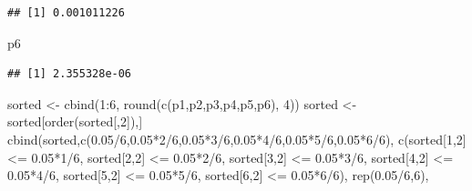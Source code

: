 \documentclass[
]{book}
\newenvironment{Shaded}{\begin{snugshade}}{\end{snugshade}}
\newcommand{\DecValTok}[1]{\textcolor[rgb]{0.00,0.00,0.81}{#1}}
\newcommand{\FloatTok}[1]{\textcolor[rgb]{0.00,0.00,0.81}{#1}}
\newcommand{\FunctionTok}[1]{\textcolor[rgb]{0.00,0.00,0.00}{#1}}
\newcommand{\NormalTok}[1]{#1}
\newcommand{\OtherTok}[1]{\textcolor[rgb]{0.56,0.35,0.01}{#1}}
\newcommand{\SpecialCharTok}[1]{\textcolor[rgb]{0.00,0.00,0.00}{#1}}
\begin{document}
\begin{verbatim}
## [1] 0.001011226
\end{verbatim}

\begin{Shaded}
\begin{Highlighting}[]
\NormalTok{p6}
\end{Highlighting}
\end{Shaded}

\begin{verbatim}
## [1] 2.355328e-06
\end{verbatim}

\begin{Shaded}
\begin{Highlighting}[]
\NormalTok{sorted }\OtherTok{\textless{}{-}} \FunctionTok{cbind}\NormalTok{(}\DecValTok{1}\SpecialCharTok{:}\DecValTok{6}\NormalTok{, }\FunctionTok{round}\NormalTok{(}\FunctionTok{c}\NormalTok{(p1,p2,p3,p4,p5,p6), }\DecValTok{4}\NormalTok{))}
\NormalTok{sorted }\OtherTok{\textless{}{-}}\NormalTok{ sorted[}\FunctionTok{order}\NormalTok{(sorted[,}\DecValTok{2}\NormalTok{]),]}
\FunctionTok{cbind}\NormalTok{(sorted,}\FunctionTok{c}\NormalTok{(}\FloatTok{0.05}\SpecialCharTok{/}\DecValTok{6}\NormalTok{,}\FloatTok{0.05}\SpecialCharTok{*}\DecValTok{2}\SpecialCharTok{/}\DecValTok{6}\NormalTok{,}\FloatTok{0.05}\SpecialCharTok{*}\DecValTok{3}\SpecialCharTok{/}\DecValTok{6}\NormalTok{,}\FloatTok{0.05}\SpecialCharTok{*}\DecValTok{4}\SpecialCharTok{/}\DecValTok{6}\NormalTok{,}\FloatTok{0.05}\SpecialCharTok{*}\DecValTok{5}\SpecialCharTok{/}\DecValTok{6}\NormalTok{,}\FloatTok{0.05}\SpecialCharTok{*}\DecValTok{6}\SpecialCharTok{/}\DecValTok{6}\NormalTok{), }\FunctionTok{c}\NormalTok{(sorted[}\DecValTok{1}\NormalTok{,}\DecValTok{2}\NormalTok{] }\SpecialCharTok{\textless{}=} \FloatTok{0.05}\SpecialCharTok{*}\DecValTok{1}\SpecialCharTok{/}\DecValTok{6}\NormalTok{, sorted[}\DecValTok{2}\NormalTok{,}\DecValTok{2}\NormalTok{] }\SpecialCharTok{\textless{}=} \FloatTok{0.05}\SpecialCharTok{*}\DecValTok{2}\SpecialCharTok{/}\DecValTok{6}\NormalTok{, sorted[}\DecValTok{3}\NormalTok{,}\DecValTok{2}\NormalTok{] }\SpecialCharTok{\textless{}=} \FloatTok{0.05}\SpecialCharTok{*}\DecValTok{3}\SpecialCharTok{/}\DecValTok{6}\NormalTok{, sorted[}\DecValTok{4}\NormalTok{,}\DecValTok{2}\NormalTok{] }\SpecialCharTok{\textless{}=} \FloatTok{0.05}\SpecialCharTok{*}\DecValTok{4}\SpecialCharTok{/}\DecValTok{6}\NormalTok{, sorted[}\DecValTok{5}\NormalTok{,}\DecValTok{2}\NormalTok{] }\SpecialCharTok{\textless{}=} \FloatTok{0.05}\SpecialCharTok{*}\DecValTok{5}\SpecialCharTok{/}\DecValTok{6}\NormalTok{, sorted[}\DecValTok{6}\NormalTok{,}\DecValTok{2}\NormalTok{] }\SpecialCharTok{\textless{}=} \FloatTok{0.05}\SpecialCharTok{*}\DecValTok{6}\SpecialCharTok{/}\DecValTok{6}\NormalTok{), }\FunctionTok{rep}\NormalTok{(}\FloatTok{0.05}\SpecialCharTok{/}\DecValTok{6}\NormalTok{,}\DecValTok{6}\NormalTok{),}

\end{Highlighting}
\end{Shaded}
\end{document}
